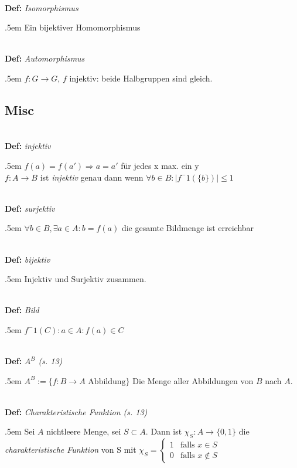 \documentclass[twocolumn, 10pt]{article}
\newenvironment {definition}
                [1][]
                {\noindent\\{\bf
                Def:}\emph{
                #1}\indent\begin{addmargin}{.5em}}{\end{addmargin}}
\begin{document}
\begin{definition}[Isomorphismus]
Ein bijektiver Homomorphismus
\end{definition}

\begin{definition}[Automorphismus]
$f:G \rightarrow G$, $f$ injektiv: beide Halbgruppen sind gleich.
\end{definition}



\subsection*{Misc}
\begin{definition}[injektiv]
$f(a)=f(a') \Rightarrow a=a'$ \glqq für jedes x max. ein y\grqq\\
$f:A\rightarrow B$ ist \emph{injektiv} genau dann wenn $\forall b \in B:
|f^-1(\{b\})| \leq 1$
\end{definition}

\begin{definition}[surjektiv]
$\forall b \in B, \exists a \in A: b = f(a)$ \glqq die gesamte Bildmenge ist
erreichbar\grqq
\end{definition}

\begin{definition}[bijektiv]
Injektiv und Surjektiv zusammen.
\end{definition}

\begin{definition}[Bild]
$f^-1(C):{a \in A: f(a) \in C}$ 
\end{definition}

\begin{definition}[$A^B$ (s. 13)]
$A^B:=\{f:B\rightarrow A \text{ Abbildung}\}$ \glqq Die Menge aller Abbildungen
von $B$ nach $A$.\grqq
\end{definition}

\begin{definition}[Charakteristische Funktion (s. 13)]
Sei $A$ nichtleere Menge, sei $S \subset A$. Dann ist $\chi_S:A\rightarrow
\{0,1\}$ die \emph{charakteristische Funktion} von S mit $\chi_S=\begin{cases}
   1 & \text{falls $x \in S$}\\
   0 & \text{falls $x \notin S$}
  \end{cases}$
\end{definition}


\end{document}
